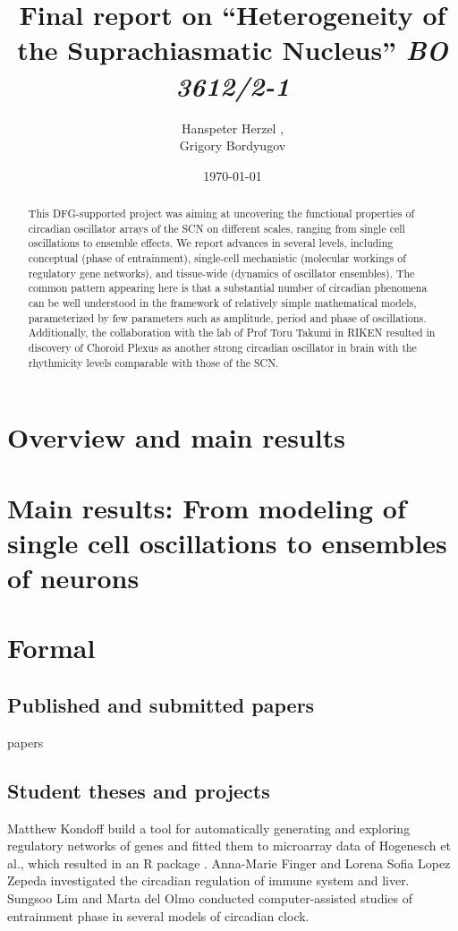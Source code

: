\documentclass[a4paper]{article}
\title{Final report on ``Heterogeneity of the Suprachiasmatic
Nucleus'' {\em BO 3612/2-1}}
\author{Hanspeter Herzel  \mailhref{h.herzel@biologie.hu-berlin.de},\\
        Grigory Bordyugov \mailhref{grigory.bordyugov@gmail.com}}
\date{\today}
\begin{document}
\maketitle

\begin{abstract}
  This DFG-supported project was aiming at uncovering the functional
  properties of circadian oscillator arrays of the SCN on different
  scales, ranging from single cell oscillations to ensemble effects.
  We report advances in several levels, including conceptual (phase of
  entrainment), single-cell mechanistic (molecular workings of
  regulatory gene networks), and tissue-wide (dynamics of oscillator
  ensembles). The common pattern appearing here is that a substantial
  number of circadian phenomena can be well understood in the
  framework of relatively simple mathematical models, parameterized by
  few parameters such as amplitude, period and phase of oscillations.
  Additionally, the collaboration with the lab of Prof Toru Takumi in
  RIKEN resulted in discovery of Choroid Plexus as another strong
  circadian oscillator in brain with the rhythmicity levels comparable
  with those of the SCN.
\end{abstract}

\tableofcontents

\section{Overview and main results}

\section{Main results: From modeling of single cell oscillations to
ensembles of neurons}




\section{Formal}

\subsection{Published and submitted papers}
papers
\cite{bordyugov2015tuning,schmal2015theoretical,kondoff2015modeling,schmal2017moran,wagner2017plant,myung2017choroid,schmal2017measuring}

\subsection{Student theses and projects}
Matthew Kondoff build a tool for automatically generating and
exploring regulatory networks of genes and fitted them to microarray
data of Hogenesch et al., which resulted in an R package
\cite{kondoff2015modeling}. Anna-Marie Finger and Lorena Sofia Lopez
Zepeda investigated the circadian regulation of immune system and
liver.  Sungsoo Lim and Marta del Olmo conducted computer-assisted
studies of entrainment phase in several models of circadian clock.
\end{document}
